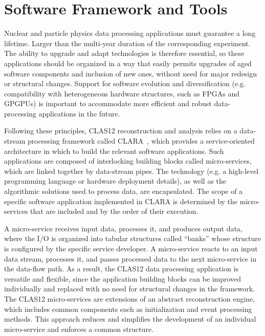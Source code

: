 \section{Software Framework and Tools}
\label{sec:framework}

Nuclear and particle physics data processing applications must guarantee a long lifetime.  Larger than the multi-year
duration of the corresponding experiment. The ability to upgrade and adapt technologies is therefore essential, so
these applications should be organized in a way that easily permits upgrades of aged software components and
inclusion of new ones, without need for major redesign or structural changes. Support for software evolution and
diversification (e.g. compatibility with heterogeneous hardware structures, such as FPGAs and GPGPUs) is important
to accommodate more efficient and robust data-processing applications in the future.

Following these principles, CLAS12 reconstruction and analysis relies on a data-stream processing framework called
CLARA~\cite{clara-2011,clara-service,framework,clara-2016}, which provides a service-oriented architecture in which
to build the relevant software applications.  Such applications are composed of interlocking building blocks called
micro-services, which are linked together by data-stream pipes. The technology (e.g. a high-level programming
language or hardware deployment details), as well as the algorithmic solutions used to process data, are encapsulated. 
The scope of a specific software application implemented in CLARA is determined by the micro-services that are
included and by the order of their execution.

A micro-service receives input data, processes it, and produces output data, where the I/O is organized into
tabular structures called ``banks'' whose structure is configured by the specific service developer. A
micro-service reacts to an input data stream, processes it, and passes processed data to the next micro-service
in the data-flow path. As a result, the CLAS12 data processing application is versatile and flexible, since the
application building blocks can be improved individually and replaced with no need for structural changes in the
framework. The CLAS12 micro-services are extensions of an abstract reconstruction engine, which includes
common components such as initialization and event processing methods. This approach reduces and simplifies the
development of an individual micro-service and enforces a common structure. 

